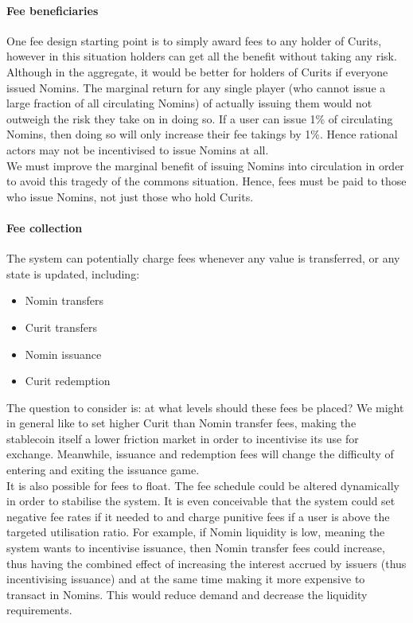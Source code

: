 \paragraph{Fee beneficiaries}

One fee design starting point is to simply award fees to any holder of Curits, however in this situation holders can get all the benefit without taking any risk. Although in the aggregate, it would be better for holders of Curits if everyone issued Nomins. The marginal return for any single player (who cannot issue a large fraction of all circulating Nomins) of actually issuing them would not outweigh the risk they take on in doing so. If a user can issue 1\% of circulating Nomins, then doing so will only increase their fee takings by 1\%. Hence rational actors may not be incentivised to issue Nomins at all. \\

\noindent We must improve the marginal benefit of issuing Nomins into circulation in order to avoid this tragedy of the commons situation. Hence, fees must be paid to those who issue Nomins, not just those who hold Curits.

\paragraph{Fee collection}

The system can potentially charge fees whenever any value is transferred, or any state is updated, including:

\begin{itemize}
    \item Nomin transfers
    \item Curit transfers
    \item Nomin issuance
    \item Curit redemption
\end{itemize}

\noindent The question to consider is: at what levels should these fees be placed? We might in general like to set higher Curit than Nomin transfer fees, making the stablecoin itself a lower friction market in order to incentivise its use for exchange. Meanwhile, issuance and redemption fees will change the difficulty of entering and exiting the issuance game. \\

\noindent It is also possible for fees to float. The fee schedule could be altered dynamically in order to stabilise the system. It is even conceivable that the system could set negative fee rates if it needed to and charge punitive fees if a user is above the targeted utilisation ratio. For example, if Nomin liquidity is low, meaning the system wants to incentivise issuance, then Nomin transfer fees could increase, thus having the combined effect of increasing the interest accrued by issuers (thus incentivising issuance) and at the same time making it more expensive to transact in Nomins. This would reduce demand and decrease the liquidity requirements. \\

